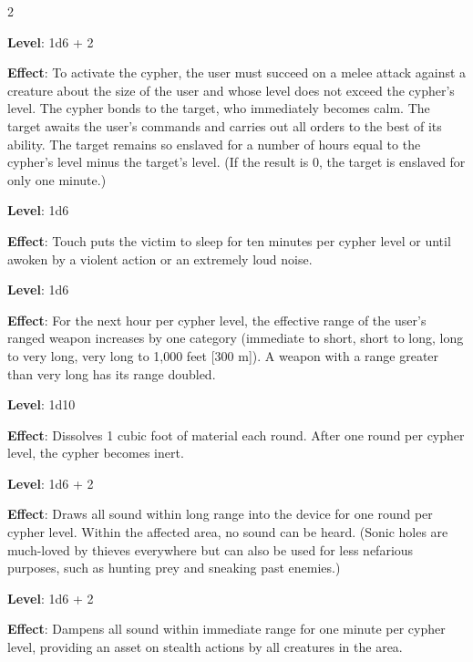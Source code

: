 \begin{multicols}{2}


\textbf{Level}: 1d6 + 2

\textbf{Effect}: To activate the cypher, the user must succeed on a melee attack against a creature about the size of the user and whose level does not exceed the cypher’s level. The cypher bonds to the target, who immediately becomes calm. The target awaits the user’s commands and carries out all orders to the best of its ability. The target remains so enslaved for a number of hours equal to the cypher’s level minus the target’s level. (If the result is 0, the target is enslaved for only one minute.)


\textbf{Level}: 1d6

\textbf{Effect}: Touch puts the victim to sleep for ten minutes per cypher level or until awoken by a violent action or an extremely loud noise.


\textbf{Level}: 1d6

\textbf{Effect}: For the next hour per cypher level, the effective range of the user’s ranged weapon increases by one category (immediate to short, short to long, long to very long, very long to 1,000 feet [300 m]). A weapon with a range greater than very long has its range doubled.


\textbf{Level}: 1d10

\textbf{Effect}: Dissolves 1 cubic foot of material each round. After one round per cypher level, the cypher becomes inert.


\textbf{Level}: 1d6 + 2

\textbf{Effect}: Draws all sound within long range into the device for one round per cypher level. Within the affected area, no sound can be heard.
(Sonic holes are much-loved by thieves everywhere but can also be used for less nefarious purposes, such as hunting prey and sneaking past enemies.)


\textbf{Level}: 1d6 + 2

\textbf{Effect}: Dampens all sound within immediate range for one minute per cypher level, providing an asset on stealth actions by all creatures in the area.


\end{multicols}
